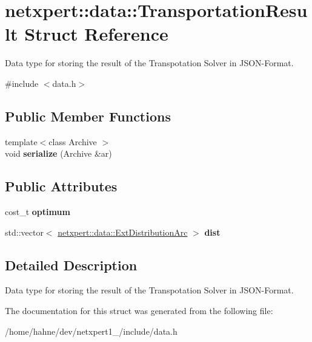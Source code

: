 \hypertarget{structnetxpert_1_1data_1_1TransportationResult}{}\section{netxpert\+:\+:data\+:\+:Transportation\+Result Struct Reference}
\label{structnetxpert_1_1data_1_1TransportationResult}


Data type for storing the result of the Transpotation Solver in J\+S\+O\+N-\/\+Format.  




{\ttfamily \#include $<$data.\+h$>$}

\subsection*{Public Member Functions}
\begin{DoxyCompactItemize}
\item 
{\footnotesize template$<$class Archive $>$ }\\void {\bfseries serialize} (Archive \&ar)\hypertarget{structnetxpert_1_1data_1_1TransportationResult_a688ff859e14c24d46073b256fba0b91d}{}\label{structnetxpert_1_1data_1_1TransportationResult_a688ff859e14c24d46073b256fba0b91d}

\end{DoxyCompactItemize}
\subsection*{Public Attributes}
\begin{DoxyCompactItemize}
\item 
cost\+\_\+t {\bfseries optimum}\hypertarget{structnetxpert_1_1data_1_1TransportationResult_a2e3f7cdd01d4e888ddbd977fcd2568f1}{}\label{structnetxpert_1_1data_1_1TransportationResult_a2e3f7cdd01d4e888ddbd977fcd2568f1}

\item 
std\+::vector$<$ \hyperlink{structnetxpert_1_1data_1_1ExtDistributionArc}{netxpert\+::data\+::\+Ext\+Distribution\+Arc} $>$ {\bfseries dist}\hypertarget{structnetxpert_1_1data_1_1TransportationResult_a6308fdc81da323f01a7a650d7f86c772}{}\label{structnetxpert_1_1data_1_1TransportationResult_a6308fdc81da323f01a7a650d7f86c772}

\end{DoxyCompactItemize}


\subsection{Detailed Description}
Data type for storing the result of the Transpotation Solver in J\+S\+O\+N-\/\+Format. 

The documentation for this struct was generated from the following file\+:\begin{DoxyCompactItemize}
\item 
/home/hahne/dev/netxpert1\+\_/include/data.\+h\end{DoxyCompactItemize}
